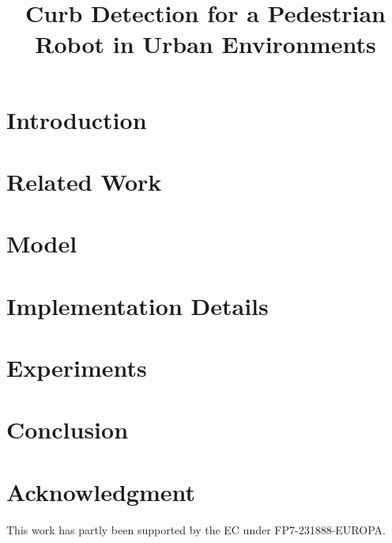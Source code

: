 \documentclass[letterpaper, 10 pt, conference]{sty/ieeeconf}
\begin{document}
\title{\LARGE \bf
Curb Detection for a Pedestrian Robot in Urban Environments
}

\author{
}

\maketitle

\begin{abstract}

\end{abstract}

\section{Introduction}


\section{Related Work\label{sec:related}}


\section{Model\label{sec:model}}


\section{Implementation Details\label{sec:implementation}}


\section{Experiments\label{sec:exp}}


\section{Conclusion\label{sec:conc}}


\section*{Acknowledgment}
This work has partly been supported by the EC under FP7-231888-EUROPA.
\vspace{6.3mm}


\end{document}

